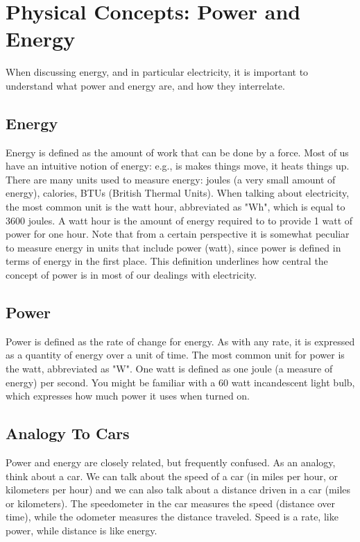 \chapter{Physical Concepts: Power and Energy}
\label{app:power-energy}

When discussing energy, and in particular electricity, it is important to understand what power and energy are, and how they interrelate.

\section{Energy}

Energy is defined as the amount of work that can be done by a force. Most of us have an intuitive notion of energy: e.g., is makes things move, it heats things up. There are many units used to measure energy: joules (a very small amount of energy), calories, BTUs (British Thermal Units). When talking about electricity, the most common unit is the watt hour, abbreviated as "Wh", which is equal to 3600 joules. A watt hour is the amount of energy required to to provide 1 watt of power for one hour. Note that from a certain perspective it is somewhat peculiar to measure energy in units that include power (watt), since power is defined in terms of energy in the first place. This definition underlines how central the concept of power is in most of our dealings with electricity.

\section{Power}

Power is defined as the rate of change for energy. As with any rate, it is expressed as a quantity of energy over a unit of time. The most common unit for power is the watt, abbreviated as "W". One watt is defined as one joule (a measure of energy) per second. You might be familiar with a 60 watt incandescent light bulb, which expresses how much power it uses when turned on.

\section{Analogy To Cars}

Power and energy are closely related, but frequently confused. As an analogy, think about a car. We can talk about the speed of a car (in miles per hour, or kilometers per hour) and we can also talk about a distance driven in a car (miles or kilometers). The speedometer in the car measures the speed (distance over time), while the odometer measures the distance traveled. Speed is a rate, like power, while distance is like energy.

